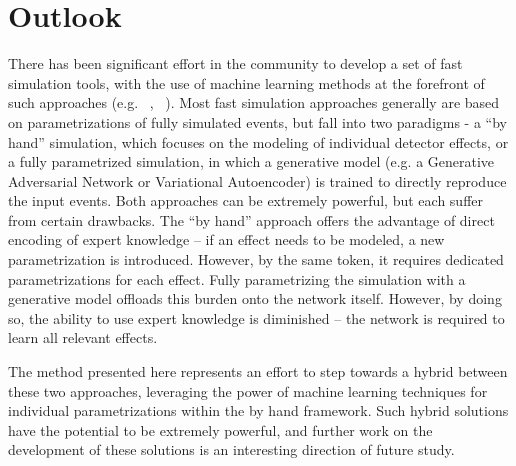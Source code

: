 \section{Outlook}
There has been significant effort in the community to develop a set of fast simulation tools, with the use of machine 
learning methods at the forefront of such approaches (e.g. ~\cite{GAN-sim}, ~\cite{DijetGAN}). Most fast simulation approaches 
generally are based on parametrizations of fully simulated events, but fall into two paradigms - a ``by hand'' simulation, which 
focuses on the modeling of individual detector effects, or a fully parametrized simulation, 
in which a generative model (e.g. a Generative Adversarial Network or Variational Autoencoder) is trained to directly 
reproduce the input events. Both approaches can be extremely powerful, but each suffer from certain drawbacks. 
The ``by hand'' approach offers the advantage of direct encoding of expert knowledge -- if an effect needs to be modeled, 
a new parametrization is introduced. However, by the same token, it requires dedicated parametrizations for each effect. 
Fully parametrizing the simulation with a generative model offloads this burden onto the network itself. However, by doing so, 
the ability to use expert knowledge is diminished -- the network is required to learn all relevant effects.

The method presented here represents an effort to step towards a hybrid between these two approaches, leveraging the power of 
machine learning techniques for individual parametrizations within the by hand framework. Such hybrid solutions have the 
potential to be extremely powerful, and further work on the development of these solutions is an interesting direction of future study.

